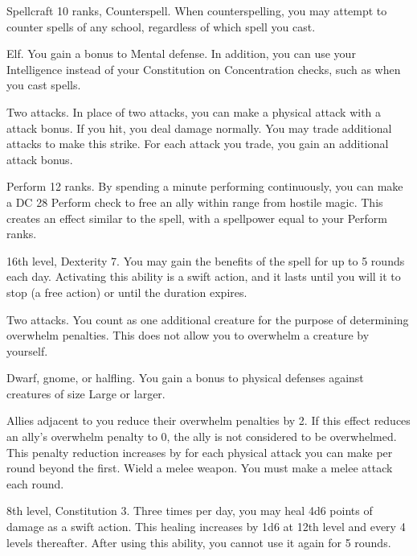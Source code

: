 \featpres Spellcraft 10 ranks, Counterspell.
\featben When counterspelling, you may attempt to counter spells of any school, regardless of which spell you cast.

\featpre Elf.
\featben You gain a  bonus to Mental defense.
In addition, you can use your Intelligence instead of your Constitution on Concentration checks, such as when you cast spells.

\featpre Two attacks.
\featben In place of two attacks, you can make a physical attack with a  attack bonus.
If you hit, you deal damage normally.
You may trade additional attacks to make this strike.
For each attack you trade, you gain an additional  attack bonus.

\featpre Perform 12 ranks.
\featben By spending a minute performing continuously, you can make a DC 28 Perform check to free an ally within \rngmed range from hostile magic.
This creates an effect similar to the 
spell, with a spellpower equal to your Perform ranks.

\featpres 16th level, Dexterity 7.
\featben You may gain the benefits of the 
spell for up to 5 rounds each day.
Activating this ability is a swift action, and it lasts until you will it to stop (a free action) or until the duration expires.

\featpre Two attacks.
\featben You count as one additional creature for the purpose of determining overwhelm penalties.
This does not allow you to overwhelm a creature by yourself.

\featpres Dwarf, gnome, or halfling.
\featben You gain a  bonus to physical defenses against creatures of size Large or larger.

\featben Allies adjacent to you reduce their overwhelm penalties by 2.
If this effect reduces an ally's overwhelm penalty to 0, the ally is not considered to be overwhelmed.
This penalty reduction increases by  for each physical attack you can make per round beyond the first.
\stylereq Wield a melee weapon.
You must make a melee attack each round.

\featpres 8th level, Constitution 3.
\featben Three times per day, you may heal 4d6 points of damage as a swift action.
This healing increases by 1d6 at 12th level and every 4 levels thereafter.
After using this ability, you cannot use it again for 5 rounds.

